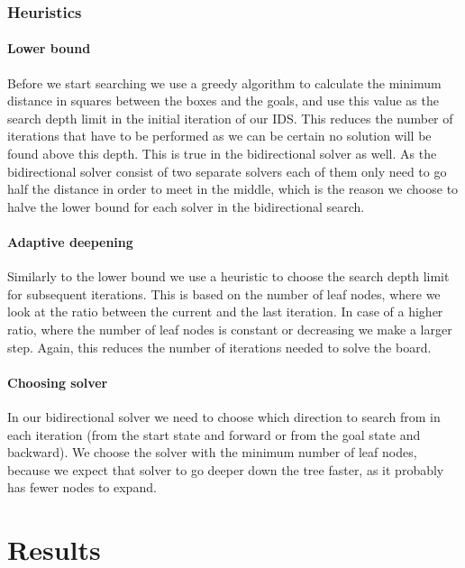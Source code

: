 \documentclass[a4paper,12pt]{article}
\renewcommand{\*}[0]{\cdot}
\begin{document}


\section{Heuristics}

\subsection{Lower bound}

Before we start searching we use a greedy algorithm to calculate the minimum
distance in squares between the boxes and the goals, and use this value as the
search depth limit in the initial iteration of our IDS. This reduces the number
of iterations that have to be performed as we can be certain no solution will be
found above this depth. This is true in the bidirectional solver as well. As the
bidirectional solver consist of two separate solvers each of them only need to
go half the distance in order to meet in the middle, which is the reason we
choose to halve the lower bound for each solver in the bidirectional search.

\subsection{Adaptive deepening}

Similarly to the lower bound we use a heuristic to choose the search depth limit
for subsequent iterations. This is based on the number of leaf nodes, where we
look at the ratio between the current and the last iteration. In case of a
higher ratio, where the number of leaf nodes is constant or decreasing we make a
larger step. Again, this reduces the number of iterations needed to solve the
board.

\subsection{Choosing solver}

In our bidirectional solver we need to choose which direction to search from in
each iteration (from the start state and forward or from the goal state and
backward). We choose the solver with the minimum number of leaf nodes, because
we expect that solver to go deeper down the tree faster, as it probably has
fewer nodes to expand.

\part*{Results}
\end{document}
